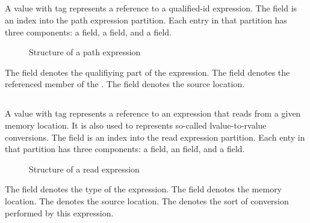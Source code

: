 

\subsection{}
\label{sec:ifc:ExprSort:Path}

A  value with tag  represents
a reference to a qualified-id expression. 
The  field is an index into the path expression partition.
Each entry in that partition has three components: a  field, a  field, and a  field.
%
\begin{figure}[H]
	\centering
	\caption{Structure of a path expression}
	\label{fig:ifc-path-expression-structure}
\end{figure}
%
The  field denotes the qualifiying part of the expression.
The  field denotes the referenced member of the .
The  field denotes the source location.



\subsection{}
\label{sec:ifc:ExprSort:Read}

A  value with tag  represents
a reference to an expression that reads from a given memory location.
It is also used to represents so-called lvalue-to-rvalue conversions.
The  field is an index into the read expression partition.
Each enty in that partition has three components: a  field, an  field, and a  field.
%
\begin{figure}[H]
	\centering
	\caption{Structure of a read expression}
	\label{fig:ifc-read-expression-structure}
\end{figure}
%
The  field denotes the type of the expression.
The  field denotes the memory location.
The  denotes the source location.
The  denotes the sort of conversion performed by this expression.

